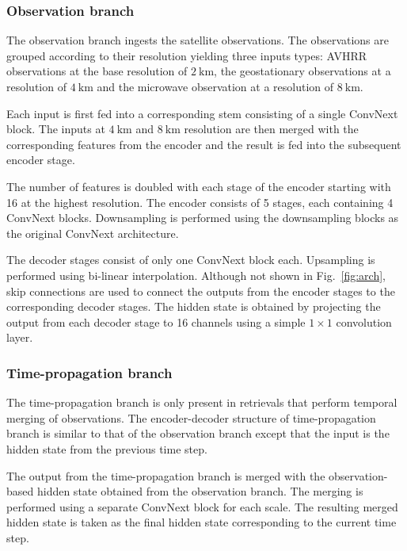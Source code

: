 \documentclass[11pt]{scrartcl}
\begin{document}
\subsubsection{Observation branch}

The observation branch ingests the satellite observations. The observations are
grouped according to their resolution yielding three inputs types: AVHRR
observations at the base resolution of $\SI{2}{\kilo \meter}$, the geostationary
observations at a resolution of $\SI{4}{\kilo \meter}$ and the microwave
observation at a resolution of $\SI{8}{\kilo \meter}$.

Each input is first fed into a corresponding stem consisting of a single
ConvNext block. The inputs at $\SI{4}{\kilo \meter}$ and $\SI{8}{\kilo \meter}$
resolution are then merged with the corresponding features from the encoder and
the result is fed into the subsequent encoder stage.

The number of features is doubled with each stage of the encoder starting with
16 at the highest resolution. The encoder consists of 5 stages, each containing
4 ConvNext blocks. Downsampling is performed using the downsampling blocks
as the original ConvNext architecture.

The decoder stages consist of only one ConvNext block each. Upsampling is
performed using bi-linear interpolation. Although not shown in
Fig.~\ref{fig:arch}, skip connections are used to connect the outputs
from the encoder stages to the corresponding decoder stages. The hidden state is
obtained by projecting the output from each decoder stage to 16 channels using a
simple $1 \times 1$ convolution layer.

\subsubsection{Time-propagation branch}

The time-propagation branch is only present in retrievals that perform temporal
merging of observations. The encoder-decoder structure of time-propagation
branch is similar to that of the observation branch except that the input is the
hidden state from the previous time step.

The output from the time-propagation branch is merged with the observation-based
hidden state obtained from the observation branch. The merging is performed
using a separate ConvNext block for each scale. The resulting merged hidden
state is taken as the final hidden state corresponding to the current time step.
\end{document}
